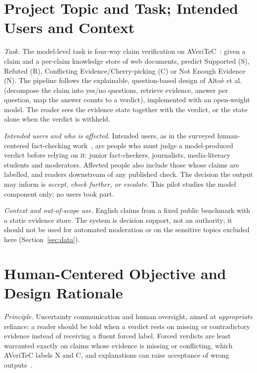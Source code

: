 \documentclass[acmlarge]{acmart}
\newcommand{\runin}[1]{\par\addvspace{4pt}\noindent\hspace{\parindent}\textit{#1}\hspace{0.45em}\ignorespaces}
\begin{document}
\section{Project Topic and Task; Intended Users and Context}\label{sec:task}
\runin{Task.} The model-level task is four-way claim verification on AVeriTeC~\cite{schlichtkrull2023}: given a claim and a per-claim knowledge store of web documents, predict Supported (S), Refuted (R), Conflicting Evidence/Cherry-picking (C) or Not Enough Evidence (N). The pipeline follows the explainable, question-based design of Alto\`e et al.~\cite{altoe2025} (decompose the claim into yes/no questions, retrieve evidence, answer per question, map the answer counts to a verdict), implemented with an open-weight model. The reader sees the evidence state together with the verdict, or the state alone when the verdict is withheld.

\runin{Intended users and who is affected.} Intended users, as in the surveyed human-centered fact-checking work~\cite{nakov2021}, are people who must judge a model-produced verdict before relying on it: junior fact-checkers, journalists, media-literacy students and moderators. Affected people also include those whose claims are labelled, and readers downstream of any published check. The decision the output may inform is \emph{accept, check further, or escalate}. This pilot studies the model component only; no users took part.

\runin{Context and out-of-scope use.} English claims from a fixed public benchmark with a static evidence store. The system is decision support, not an authority; it should not be used for automated moderation or on the sensitive topics excluded here (Section~\ref{sec:data}).

\section{Human-Centered Objective and Design Rationale}\label{sec:objective}
\runin{Principle.} Uncertainty communication and human oversight, aimed at \emph{appropriate} reliance: a reader should be told when a verdict rests on missing or contradictory evidence instead of receiving a fluent forced label. Forced verdicts are least warranted exactly on claims whose evidence is missing or conflicting, which AVeriTeC labels N and C, and explanations can raise acceptance of wrong outputs~\cite{bansal2021,si2024}.
\end{document}
